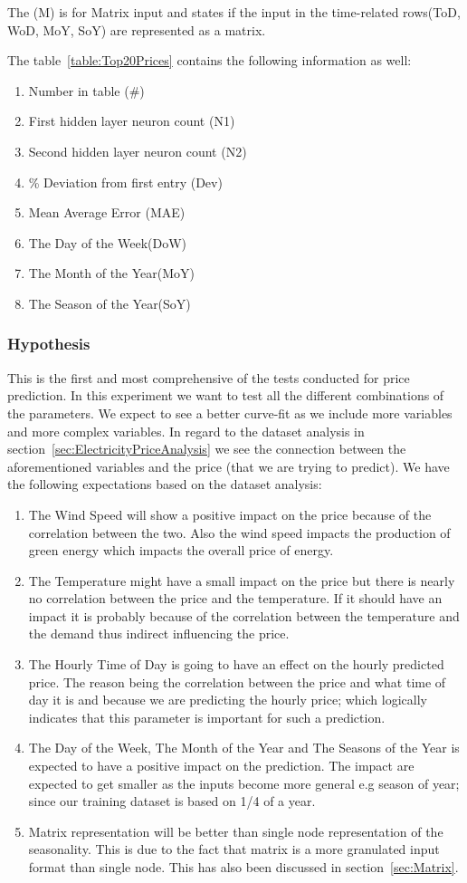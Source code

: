 The (M) is for Matrix input and states if the input in the time-related rows(ToD, WoD, MoY, SoY) are represented as a matrix.

The table~\ref{table:Top20Prices} contains the following information as well:
\begin{enumerate}
	\item Number in table (\#)
	\item First hidden layer neuron count (N1)
	\item Second hidden layer neuron count (N2)
	\item \% Deviation from first entry (Dev)
	\item Mean Average Error (MAE)
	\item The Day of the Week(DoW)
	\item The Month of the Year(MoY)
	\item The Season of the Year(SoY)
\end{enumerate}

\subsubsection{Hypothesis}
This is the first and most comprehensive of the tests conducted for price prediction. In this experiment we want to test all the different combinations of the parameters. We expect to see a better curve-fit as we include more variables and more complex variables. In regard to the dataset analysis in section~\ref{sec:ElectricityPriceAnalysis} we see the connection between the aforementioned variables and the price (that we are trying to predict). We have the following expectations based on the dataset analysis:
\begin{enumerate}
	\item The Wind Speed will show a positive impact on the price because of the correlation between the two. Also the wind speed impacts the production of green energy which impacts the overall price of energy.
	\item The Temperature might have a small impact on the price but there is nearly no correlation between the price and the temperature. If it should have an impact it is probably because of the correlation between the temperature and the demand thus indirect influencing the price.
	\item The Hourly Time of Day is going to have an effect on the hourly predicted price. The reason being the correlation between the price and what time of day it is and because we are predicting the hourly price; which logically indicates that this parameter is important for such a prediction. 
	\item The Day of the Week, The Month of the Year and The Seasons of the Year is expected to have a positive impact on the prediction. The impact are expected to get smaller as the inputs become more general e.g season of year; since our training dataset is based on 1/4 of a year. 
	\item Matrix representation will be better than single node representation of the seasonality. This is due to the fact that matrix is a more granulated input format than single node. This has also been discussed in section~\ref{sec:Matrix}.
\end{enumerate}

